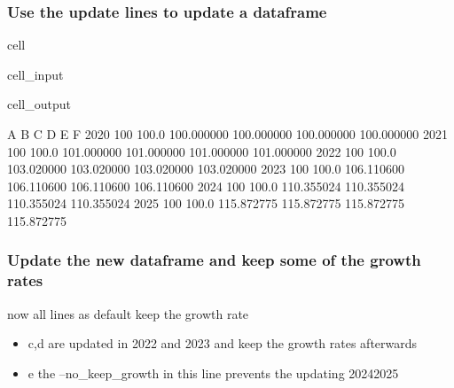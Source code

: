 \documentclass[letterpaper,10pt,english]{jupyterBook}
\begin{document}
\subsubsection{Use the update lines to update a dataframe}
\label{\detokenize{content/howto/update/model update:use-the-update-lines-to-update-a-dataframe}}
\begin{sphinxuseclass}{cell}\begin{sphinxVerbatimInput}

\begin{sphinxuseclass}{cell_input}
\begin{sphinxVerbatim}[commandchars=\\\{\}]
  
\end{sphinxVerbatim}

\end{sphinxuseclass}\end{sphinxVerbatimInput}
\begin{sphinxVerbatimOutput}

\begin{sphinxuseclass}{cell_output}
\begin{sphinxVerbatim}[commandchars=\\\{\}]
        A      B           C           D           E           F
2020  100  100.0  100.000000  100.000000  100.000000  100.000000
2021  100  100.0  101.000000  101.000000  101.000000  101.000000
2022  100  100.0  103.020000  103.020000  103.020000  103.020000
2023  100  100.0  106.110600  106.110600  106.110600  106.110600
2024  100  100.0  110.355024  110.355024  110.355024  110.355024
2025  100  100.0  115.872775  115.872775  115.872775  115.872775
\end{sphinxVerbatim}

\end{sphinxuseclass}\end{sphinxVerbatimOutput}

\end{sphinxuseclass}

\subsubsection{Update the new dataframe and keep some of the growth rates}
\label{\detokenize{content/howto/update/model update:update-the-new-dataframe-and-keep-some-of-the-growth-rates}}
\sphinxAtStartPar
{} now all lines as default keep the growth rate
\begin{itemize}
\item {} 
\sphinxAtStartPar
c,d are updated in 2022 and 2023 and keep the growth rates afterwards

\item {} 
\sphinxAtStartPar
e the –no\_keep\_growth in this line prevents the updating 2024\sphinxhyphen{}2025

\end{itemize}
\end{document}
